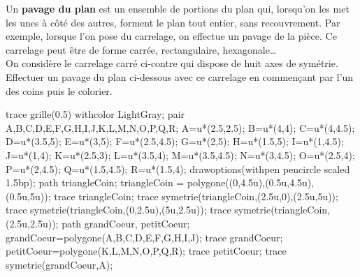 \vspace*{-10mm}
\begin{enigme}[Pavage]
    \begin{changemargin}{-10mm}{-10mm}
        \begin{minipage}{12cm}
            Un {\bf pavage du plan} est un ensemble de portions du plan qui, lorsqu'on les met les unes à côté des autres, forment le plan tout entier, sans recouvrement. Par exemple, lorsque l'on pose du carrelage, on effectue un pavage de la pièce. Ce carrelage peut être de forme carrée, rectangulaire, hexagonale\dots \\
            On considère le carrelage carré ci-contre qui dispose de huit axes de symétrie. \\
            Effectuer un pavage du plan ci-dessous avec ce carrelage en commençant par l'un des coins puis le colorier.
         \end{minipage}
         \qquad
         \begin{minipage}{4.5cm}
            \begin{Geometrie}[CoinHD={(5u,5u)}]
                trace grille(0.5) withcolor LightGray;
                pair A,B,C,D,E,F,G,H,I,J,K,L,M,N,O,P,Q,R;
                A=u*(2.5,2.5);
                B=u*(4,4);
                C=u*(4,4.5);
                D=u*(3.5,5);
                E=u*(3,5);
                F=u*(2.5,4.5);
                G=u*(2,5);
                H=u*(1.5,5);
                I=u*(1,4.5);
                J=u*(1,4);
                K=u*(2.5,3);
                L=u*(3.5,4);
                M=u*(3.5,4.5);
                N=u*(3,4.5);
                O=u*(2.5,4);
                P=u*(2,4.5);
                Q=u*(1.5,4.5);
                R=u*(1.5,4);
                drawoptions(withpen pencircle scaled 1.5bp);
                path triangleCoin;
                triangleCoin = polygone((0,4.5u),(0.5u,4.5u),(0.5u,5u));
                trace triangleCoin;
                trace symetrie(triangleCoin,(2.5u,0),(2.5u,5u));
                trace symetrie(triangleCoin,(0,2.5u),(5u,2.5u));
                trace symetrie(triangleCoin,(2.5u,2.5u));
                path grandCoeur, petitCoeur;
                grandCoeur=polygone(A,B,C,D,E,F,G,H,I,J);
                trace grandCoeur;                
                petitCoeur=polygone(K,L,M,N,O,P,Q,R);
                trace petitCoeur;
                trace symetrie(grandCoeur,A);

\end{Geometrie}
\end{minipage}
\end{changemargin}
\end{enigme}
